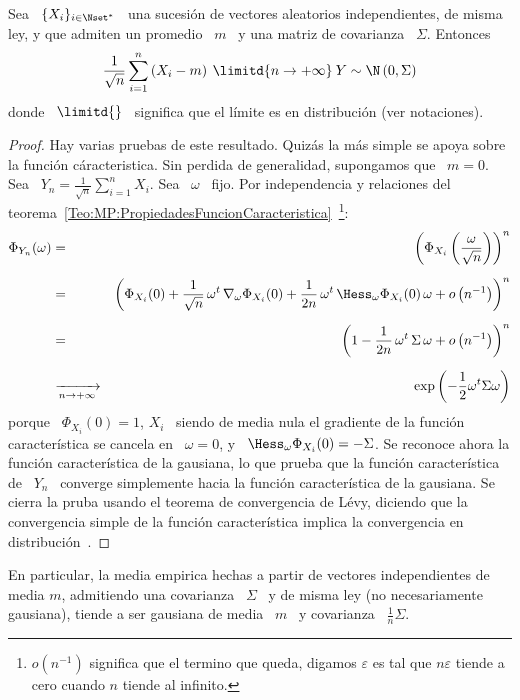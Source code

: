 \begin{teorema}\label{Teo:MP:CLT}
%
  Sea  \  $\{  X_i \}_{i  \in  \Nset^*}$  \  una  sucesi\'on de  vectores  aleatorios
  independientes, de misma ley,  y que admiten un promedio \ $m$  \ y una matriz
  de covarianza \ $\Sigma$. Entonces
  \[
  \frac{1}{\sqrt{n}}  \sum_{i=1}^n  \left( X_i  -  m  \right)  \: \limitd{n  \to
    +\infty} \: Y \sim \N\left( 0 , \Sigma \right)
  \]
  donde  \ $\limitd{}$ \  significa que  el l\'imite  es en  distribuci\'on (ver
  notaciones).
\end{teorema}
\begin{proof}
  Hay varias pruebas de este resultado.  Quiz\'as la m\'as simple se apoya sobre
  la funci\'on  c\'aracteristica.  Sin perdida de generalidad,  supongamos que \
  $m = 0$. Sea \ $\displaystyle Y_n = \frac{1}{\sqrt{n}} \sum_{i=1}^n X_i$.  Sea
  \    $\omega$    \    fijo.     Por    independencia    y    relaciones    del
  teorema~\ref{Teo:MP:PropiedadesFuncionCaracteristica}~\footnote{$o\left(
      n^{-1} \right)$ significa que  el termino que queda, digamos $\varepsilon$
    es tal que $n \varepsilon$ tiende a cero cuando $n$ tiende al infinito.}:
  \begin{eqnarray*}
  \Phi_{Y_n}(\omega) & = & \left( \Phi_{X_i}\left( \frac{\omega}{\sqrt{n}}
  \right) \right)^n\\[2mm]
& = & \left( \Phi_{X_i}(0) + \frac{1}{\sqrt{n}} \, \omega^t \, \nabla_\omega
  \Phi_{X_i}(0) + \frac{1}{2 n} \, \omega^t \, \Hess_\omega\Phi_{X_i}(0) \, \omega +
  o\left( n^{-1} \right) \right)^n\\[2mm]
  & = & \left( 1 - \frac{1}{2 n} \, \omega^t \, \Sigma \, \omega +
  o\left( n^{-1} \right) \right)^n\\[2mm]
  & \xrightarrow[n \to +\infty]{} & \exp\left( -\frac12 \omega^t \Sigma \omega \right)
  \end{eqnarray*}
  porque \ $\Phi_{X_i}(0) = 1$, $X_i$ \  siendo de media nula el gradiente de la
  funci\'on   caracter\'istica   se  cancela   en   \   $\omega   =  0$,   y   \
  $\Hess_\omega\Phi_{X_i}(0)  =  -  \Sigma$.   Se reconoce  ahora  la  funci\'on
  caracter\'istica   de  la   gausiana,   lo  que   prueba   que  la   funci\'on
  caracter\'istica  de  \  $Y_n$  \  converge  simplemente  hacia  la  funci\'on
  caracter\'istica  de la gausiana.   Se cierra  la pruba  usando el  teorema de
  convergencia de  L\'evy, diciendo que  la convergencia simple de  la funci\'on
  caracter\'istica  implica  la  convergencia en  distribuci\'on~\cite{AshDol99,
    Bil12, AthLah06}.
\end{proof}
%
En particular, la  media empirica hechas a partir  de vectores independientes de
media  $m$,  admitiendo  una  covarianza  \  $\Sigma$  \  y  de  misma  ley  (no
necesariamente gausiana), tiende a ser gausiana  de media \ $m$ \ y covarianza \
$\frac{1}{n} \Sigma$.

